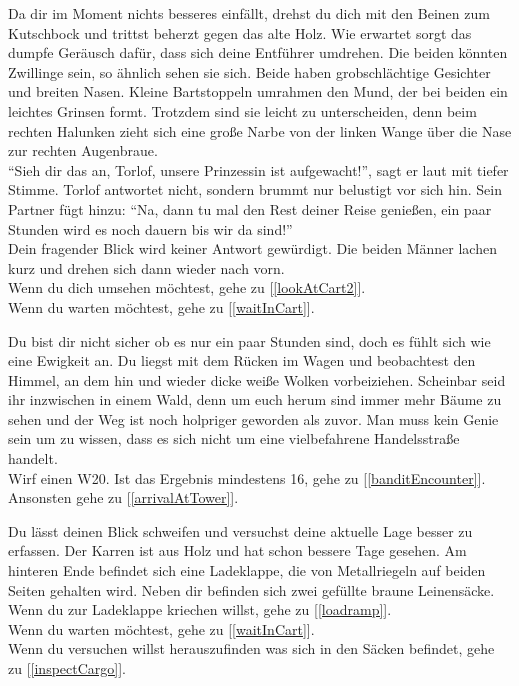 Da dir im Moment nichts besseres einfällt, drehst du dich mit den Beinen zum Kutschbock und trittst beherzt gegen das alte Holz. Wie erwartet sorgt das dumpfe Geräusch dafür, dass sich deine Entführer umdrehen. Die beiden könnten Zwillinge sein, so ähnlich sehen sie sich. Beide haben grobschlächtige Gesichter und breiten Nasen. Kleine Bartstoppeln umrahmen den Mund, der bei beiden ein leichtes Grinsen formt. Trotzdem sind sie leicht zu unterscheiden, denn beim rechten Halunken zieht sich eine große Narbe von der linken Wange über die Nase zur rechten Augenbraue.\\
``Sieh dir das an, Torlof, unsere Prinzessin ist aufgewacht!'', sagt er laut mit tiefer Stimme. Torlof antwortet nicht, sondern brummt nur belustigt vor sich hin. Sein Partner fügt hinzu: ``Na, dann tu mal den Rest deiner Reise genießen, ein paar Stunden wird es noch dauern bis wir da sind!''\\
Dein fragender Blick wird keiner Antwort gewürdigt. Die beiden Männer lachen kurz und drehen sich dann wieder nach vorn.
\\Wenn du dich umsehen möchtest, gehe zu [\ref{lookAtCart2}].
\\Wenn du warten möchtest, gehe zu [\ref{waitInCart}].


Du bist dir nicht sicher ob es nur ein paar Stunden sind, doch es fühlt sich wie eine Ewigkeit an. Du liegst mit dem Rücken im Wagen und beobachtest den Himmel, an dem hin und wieder dicke weiße Wolken vorbeiziehen. Scheinbar seid ihr inzwischen in einem Wald, denn um euch herum sind immer mehr Bäume zu sehen und der Weg ist noch holpriger geworden als zuvor. Man muss kein Genie sein um zu wissen, dass es sich nicht um eine vielbefahrene Handelsstraße handelt.\\
Wirf einen W20. Ist das Ergebnis mindestens 16, gehe zu [\ref{banditEncounter}].\\
Ansonsten gehe zu [\ref{arrivalAtTower}].


Du lässt deinen Blick schweifen und versuchst deine aktuelle Lage besser zu erfassen. Der Karren ist aus Holz und hat schon bessere Tage gesehen. Am hinteren Ende befindet sich eine Ladeklappe, die von Metallriegeln auf beiden Seiten gehalten wird. Neben dir befinden sich zwei gefüllte braune Leinensäcke.
\\Wenn du zur Ladeklappe kriechen willst, gehe zu [\ref{loadramp}].
\\Wenn du warten möchtest, gehe zu [\ref{waitInCart}].
\\Wenn du versuchen willst herauszufinden was sich in den Säcken befindet, gehe zu [\ref{inspectCargo}].

